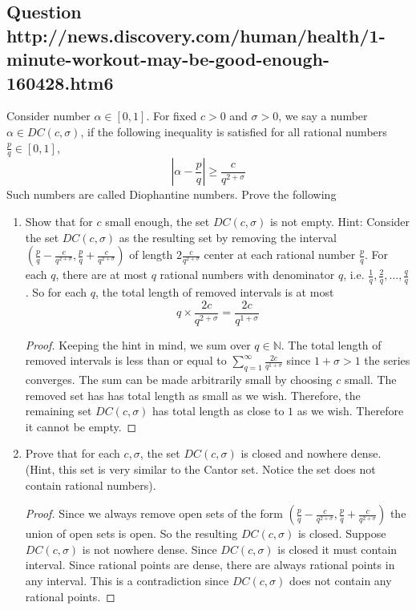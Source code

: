 \documentclass{tufte-book}
\theoremstyle{mytheoremstyle}
\theoremstyle{mylemstyle}
\theoremstyle{mydefstyle}
\begin{document}
\subsection{Question http://news.discovery.com/human/health/1-minute-workout-may-be-good-enough-160428.htm6}
Consider number $\alpha \in [0,1]$. For fixed $c>0$ and $\sigma>0$, we say a number $\alpha \in DC(c,\sigma)$, if the following inequality is satisfied for all rational numbers $\frac{p}{q} \in [0,1]$,
\[\left| \alpha-\frac{p}{q}\right| \geq \frac{c}{q^{2+\sigma}}\]
Such numbers are called Diophantine numbers.  Prove the following

\begin{enumerate}
\item Show that for $c$ small enough, the set $DC(c,\sigma)$ is not empty.
Hint: Consider the set $DC(c,\sigma)$ as the resulting set by removing the interval $(\frac{p}{q} - \frac{c}{q^{2+\sigma}}, \frac{p}{q} + \frac{c}{q^{2+\sigma}})$ of length $2\frac{c}{q^{2+\sigma}}$ center at each rational number $\frac{p}{q}$.  For each $q$, there are at most $q$ rational numbers with denominator $q$, i.e. $\frac{1}{q}, \frac{2}{q},...,\frac{q}{q}$.  So for each $q$, the total length of removed intervals is at most
\[ q \times \frac{2c}{q^{2+\sigma}} = \frac{2c}{q^{1+\sigma}} \] 
\begin{proof}
Keeping the hint in mind, we sum over $q \in \mathbb{N}$.  The total length of removed intervals is less than or equal to $\sum_{q=1}^{\infty}\frac{2c}{q^{1+\sigma}}$ since $1 + \sigma >1$ the series converges.  The sum can be made arbitrarily small by choosing $c$ small.  The removed set has has total length as small as we wish.  Therefore, the remaining set $DC(c,\sigma)$ has total length as close to $1$ as we wish.  Therefore it cannot be empty.
\end{proof}

\item Prove that for each $c,\sigma$, the set $DC(c,\sigma)$ is closed and nowhere dense. (Hint, this set is very similar to the Cantor set.  Notice the set does not contain rational numbers).

\begin{proof}

Since we always remove open sets of the form $(\frac{p}{q} - \frac{c}{q^{2+\sigma}}, \frac{p}{q} + \frac{c}{q^{2+\sigma}})$ the union of open sets is open.  So the resulting $DC(c,\sigma)$ is closed. Suppose $DC(c,\sigma)$ is not nowhere dense.  Since $DC(c, \sigma)$ is closed it must contain interval.  Since rational points are dense, there are always rational points in any interval.  This is a contradiction since $DC(c, \sigma)$ does not contain any rational points.
\end{proof}

\end{enumerate}
\end{document}
